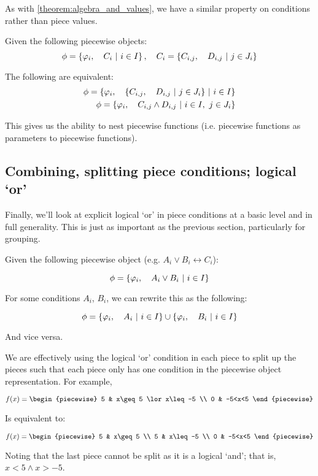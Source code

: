 \begin{theorem}
    \label{theorem:algebra_and_conditions}
    As with \ref{theorem:algebra_and_values}, we have a similar property on conditions rather than piece values.

    Given the following piecewise objects:
    $$
        \phi=\left\{\varphi_i,\quad C_i\ \middle|\ i\in I\right\},\quad C_i=\left\{C_{i,j},\quad D_{i,j}\ \middle|\ j\in J_i\right\}
    $$

    The following are equivalent:
    \begin{align*}
        \phi=\left\{\varphi_i,\quad \left\{C_{i,j},\quad D_{i,j}\ \middle|\ j\in J_i\right\}\ \middle|\ i\in I\right\} \\
        \phi=\left\{\varphi_i,\quad C_{i,j}\land D_{i,j}\ \middle|\ i\in I,\ j\in J_i\right\}
    \end{align*}

    This gives us the ability to nest piecewise functions (i.e. piecewise functions as parameters to piecewise functions).
\end{theorem}


\subsection{Combining, splitting piece conditions; logical `or'}
Finally, we'll look at explicit logical `or' in piece conditions at a basic level and in full generality. This is just as important as the previous section, particularly for grouping.

\begin{theorem}
    Given the following piecewise object (e.g. $A_i\lor B_i\leftrightarrow C_i$):

    $$
        \phi=\left\{\varphi_i,\quad A_i\lor B_i\ \middle|\ i\in I\right\}
    $$

    For some conditions $A_i$, $B_i$, we can rewrite this as the following:

    $$
        \phi=\left\{\varphi_i,\quad A_i\ \middle|\ i\in I\right\}\cup\left\{\varphi_i,\quad B_i\ \middle|\ i\in I\right\}
    $$

    And vice versa.

    We are effectively using the logical `or' condition in each piece to split up the pieces such that each piece only has one condition in the piecewise object representation. For example,

    $$
        f(x) = \begin{piecewise}
            5 & x\geq 5 \lor x\leq -5 \\
            0 & -5<x<5
        \end{piecewise}
    $$

    Is equivalent to:

    $$
        f(x) = \begin{piecewise}
            5 & x\geq 5 \\
            5 & x\leq -5 \\
            0 & -5<x<5
        \end{piecewise}
    $$

    Noting that the last piece cannot be split as it is a logical `and'; that is, $x<5\land x>-5$.
\end{theorem}

